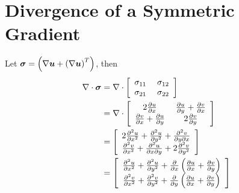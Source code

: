 \documentclass{article}
\begin{document}
\section*{Divergence of a Symmetric Gradient}
Let $\boldsymbol\sigma=\left( \nabla\boldsymbol u+\left( \nabla\boldsymbol u \right)^T \right)$, then
\begin{align*}
\nabla\cdot\boldsymbol\sigma&=\nabla\cdot\left[ \begin{array}{cc} \sigma_{11}\; & \sigma_{12}\\ \sigma_{21}\; & \sigma_{22}\\ \end{array} \right]\\
&=\nabla\cdot\left[ \begin{array}{cc} 2\frac{\partial u}{\partial x}\; & \frac{\partial u}{\partial y}+\frac{\partial v}{\partial x}\\ \frac{\partial v}{\partial x}+\frac{\partial u}{\partial y}\; & 2\frac{\partial v}{\partial y}\\ \end{array} \right]\\
&=\left[ \begin{array}{c} 2\frac{\partial^2u}{\partial x^2}+\frac{\partial^2u}{\partial y^2}+\frac{\partial^2v}{\partial y\partial x}\\ \frac{\partial^2v}{\partial x^2}+\frac{\partial^2u}{\partial x\partial y}+2\frac{\partial^2v}{\partial y^2}\\ \end{array} \right]\\
&=\left[ \begin{array}{c} \frac{\partial^2u}{\partial x^2}+\frac{\partial^2u}{\partial y^2}
+\frac{\partial}{\partial x}\left( \frac{\partial u}{\partial x}+\frac{\partial v}{\partial y} \right)\\ \frac{\partial^2v}{\partial x^2}+\frac{\partial^2v}{\partial y^2}
+\frac{\partial}{\partial y}\left( \frac{\partial u}{\partial x}+\frac{\partial v}{\partial y} \right)\\ \end{array} \right]
\end{align*}
\end{document}
